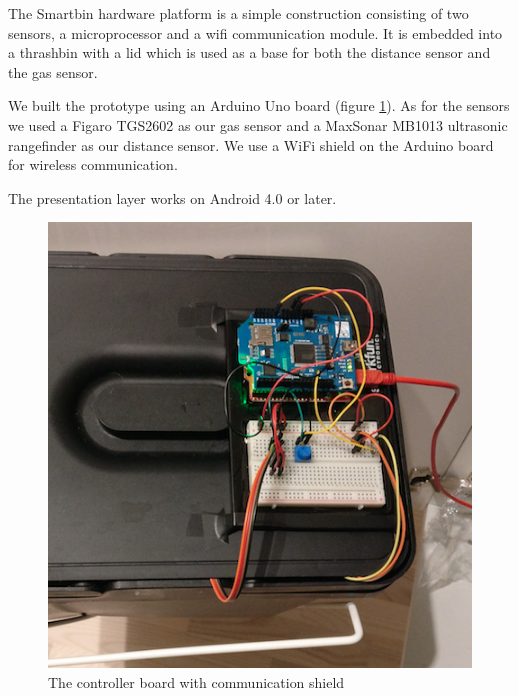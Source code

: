 The Smartbin hardware platform is a simple construction consisting of two sensors, a microprocessor and a wifi communication module. It is embedded into a thrashbin with a lid which is used
as a base for both the distance sensor and the gas sensor.

We built the prototype using an Arduino Uno board (figure \ref{fig:board}).
 As for the sensors we used a Figaro TGS2602 as our gas sensor and a MaxSonar MB1013 ultrasonic rangefinder as our distance sensor.
We use a WiFi shield on the Arduino board for wireless communication.

The presentation layer works on Android 4.0 or later.

\begin{figure}
\centering
\includegraphics[scale=.3]{img/arduinoboard}
\caption{The controller board with communication shield}
\label{fig:board}
\end{figure}